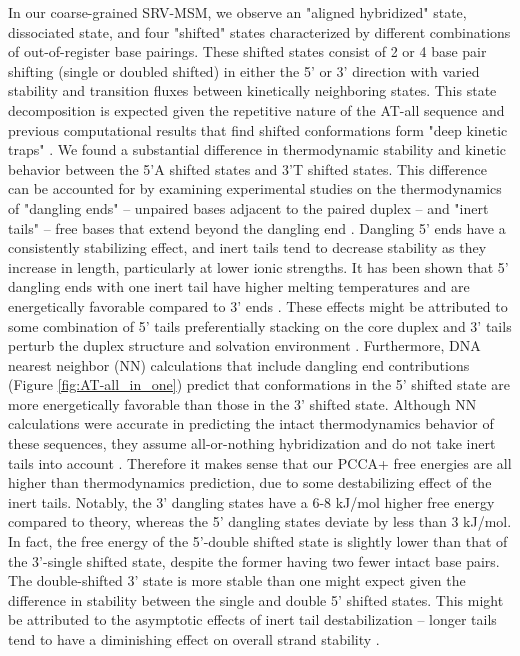 \documentclass[journal=jpcbfk,manuscript=article]{achemso}
\begin{document}
In our coarse-grained SRV-MSM, we observe an "aligned hybridized" state, dissociated state, and four "shifted" states characterized by different combinations of out-of-register base pairings. These shifted states consist of 2 or 4 base pair shifting (single or doubled shifted) in either the 5' or 3' direction with varied stability and transition fluxes between kinetically neighboring states. This state decomposition is expected given the repetitive nature of the AT-all sequence and previous computational results that find shifted conformations form "deep kinetic traps" \citep{Xiao2019, Phys2014}. We found a substantial difference in thermodynamic stability and kinetic behavior between the 5'A shifted states and 3'T shifted states. This difference can be accounted for by examining experimental studies on the thermodynamics of "dangling ends" -- unpaired bases adjacent to the paired duplex -- and "inert tails" -- free bases that extend beyond the dangling end \citep{Michele2014EHybridization}. Dangling 5' ends have a consistently stabilizing effect, and inert tails tend to decrease stability as they increase in length, particularly at lower ionic strengths. It has been shown that 5' dangling ends with one inert tail have higher melting temperatures and are energetically favorable compared to 3' ends \citep{Senior1988InfluenceDuplexes, Dickman2012ThermodynamicDNAs}. These effects might be attributed to some combination of 5' tails preferentially stacking on the core duplex and 3' tails perturb the duplex structure and solvation environment \citep{Doktycz1990ThermodynamicATGC}. Furthermore, DNA nearest neighbor (NN) calculations that include dangling end contributions (Figure \ref{fig:AT-all_in_one}) predict that conformations in the 5' shifted state are more energetically favorable than those in the 3' shifted state. Although NN calculations were accurate in predicting the intact thermodynamics behavior of these sequences, they assume all-or-nothing hybridization and do not take inert tails into account \citep{Santalucia2004TM, SantaLucia1998AThermodynamics}. Therefore it makes sense that our PCCA+ free energies are all higher than thermodynamics prediction, due to some destabilizing effect of the inert tails. Notably, the 3' dangling states have a 6-8 kJ/mol higher free energy compared to theory, whereas the 5' dangling states deviate by less than 3 kJ/mol. In fact, the free energy of the 5'-double shifted state is slightly lower than that of the 3'-single shifted state, despite the former having two fewer intact base pairs. The double-shifted 3' state is more stable than one might expect given the difference in stability between the single and double 5' shifted states. This might be attributed to the asymptotic effects of inert tail destabilization -- longer tails tend to have a diminishing effect on overall strand stability \citep{Michele2014EHybridization}.
\end{document}
